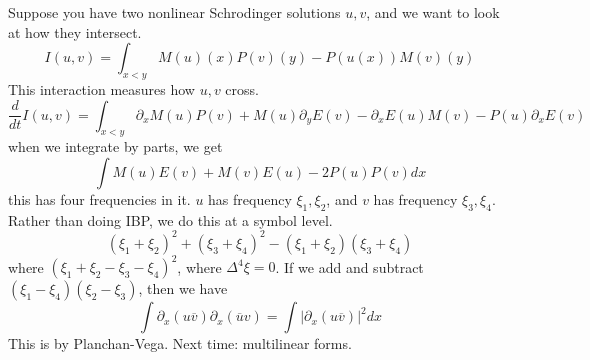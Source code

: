 Suppose you have two nonlinear Schrodinger solutions $u,v$, and we want to look at how they intersect.
\begin{equation*}
    I(u,v)=\int_{x<y}M(u)(x)P(v)(y)-P(u(x))M(v)(y)
\end{equation*}
This interaction measures how $u,v$ cross.
\begin{equation*}
    \frac{d}{dt}I(u,v)=\int_{x<y}\partial_xM(u)P(v)+M(u)\partial_yE(v)-\partial_xE(u)M(v)-P(u)\partial_xE(v)
\end{equation*}
when we integrate by parts, we get 
\begin{equation*}
    \int M(u)E(v)+M(v)E(u)-2P(u)P(v)dx
\end{equation*}
this has four frequencies in it. $u$ has frequency $\xi_1, \xi_2$, and $v$ has frequency $\xi_3, \xi_4$. Rather than doing IBP, we do this at a symbol level.
\begin{equation*}
    (\xi_1+\xi_2)^2+(\xi_3+\xi_4)^2-(\xi_1+\xi_2)(\xi_3+\xi_4)
\end{equation*}
where $(\xi_1+\xi_2-\xi_3-\xi_4)^2$, where $\Delta^4\xi=0$. If we add and subtract $(\xi_1-\xi_4)(\xi_2-\xi_3)$, then we have 
\begin{equation*}
    \int \partial_x(u\overline{v})\partial_x(\overline{u}v)=\int|\partial_x(u\overline{v})|^2dx
\end{equation*}
This is by Planchan-Vega. Next time: multilinear forms.



